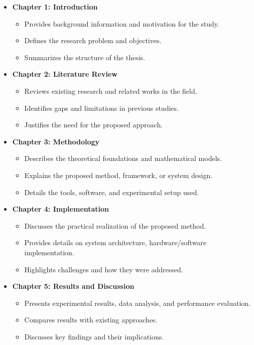 \begin{itemize}
    \item \textbf{Chapter 1: Introduction}
    \begin{itemize}
        \item Provides background information and motivation for the study.
        \item Defines the research problem and objectives.
        \item Summarizes the structure of the thesis.
    \end{itemize}

    \item \textbf{Chapter 2: Literature Review}
    \begin{itemize}
        \item Reviews existing research and related works in the field.
        \item Identifies gaps and limitations in previous studies.
        \item Justifies the need for the proposed approach.
    \end{itemize}

    \item \textbf{Chapter 3: Methodology}
    \begin{itemize}
        \item Describes the theoretical foundations and mathematical models.
        \item Explains the proposed method, framework, or system design.
        \item Details the tools, software, and experimental setup used.
    \end{itemize}

    \item \textbf{Chapter 4: Implementation}
    \begin{itemize}
        \item Discusses the practical realization of the proposed method.
        \item Provides details on system architecture, hardware/software implementation.
        \item Highlights challenges and how they were addressed.
    \end{itemize}

    \item \textbf{Chapter 5: Results and Discussion}
    \begin{itemize}
        \item Presents experimental results, data analysis, and performance evaluation.
        \item Compares results with existing approaches.
        \item Discusses key findings and their implications.
    \end{itemize}


\end{itemize}
